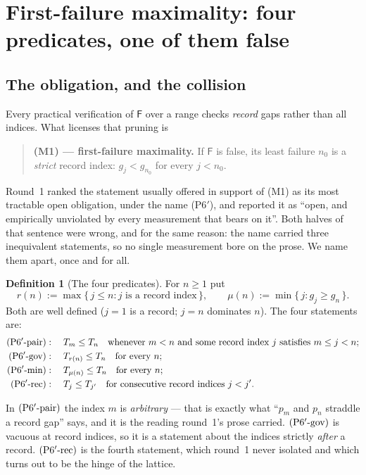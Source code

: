 \documentclass[11pt,a4paper]{article}
\theoremstyle{plain}
\theoremstyle{definition}
\newtheorem{definition}[theorem]{Definition}
\theoremstyle{remark}
\newcommand{\Fb}{\mathsf{F}}
\newcommand{\Ppair}{\textup{(P6$'$-pair)}}
\newcommand{\Pgov}{\textup{(P6$'$-gov)}}
\newcommand{\Pmin}{\textup{(P6$'$-min)}}
\newcommand{\Prec}{\textup{(P6$'$-rec)}}
\begin{document}
\section{First-failure maximality: four predicates, one of them false}
\label{sec:predicates}

\subsection{The obligation, and the collision}

Every practical verification of $\Fb$ over a range checks \emph{record} gaps rather than all
indices. What licenses that pruning is

\begin{quote}
\textbf{(M1) --- first-failure maximality.} If $\Fb$ is false, its least failure $n_0$ is a
\emph{strict} record index: $g_j < g_{n_0}$ for every $j < n_0$.
\end{quote}

Round~1 ranked the statement usually offered in support of (M1) as its most tractable open
obligation, under the name (P6$'$), and reported it as ``open, and empirically unviolated by
every measurement that bears on it''. Both halves of that sentence were wrong, and for the
same reason: the name carried three inequivalent statements, so no single measurement bore on
the prose. We name them apart, once and for all.

\begin{definition}[The four predicates]
\label{def:predicates}
For $n \ge 1$ put
\[
r(n) := \max\{\, j \le n : j \text{ is a record index} \,\},
\qquad
\mu(n) := \min\{\, j : g_j \ge g_n \,\} .
\]
Both are well defined ($j = 1$ is a record; $j = n$ dominates $n$). The four statements are:
\begin{align*}
\Ppair &: \quad T_m \le T_n
  \quad\text{whenever } m < n \text{ and some record index } j \text{ satisfies } m \le j < n;\\
\Pgov  &: \quad T_{r(n)} \le T_n \quad \text{for every } n;\\
\Pmin  &: \quad T_{\mu(n)} \le T_n \quad \text{for every } n;\\
\Prec  &: \quad T_j \le T_{j'} \quad \text{for consecutive record indices } j < j' .
\end{align*}
\end{definition}

In $\Ppair$ the index $m$ is \emph{arbitrary} --- that is exactly what ``$p_m$ and $p_n$
straddle a record gap'' says, and it is the reading round~1's prose carried. $\Pgov$ is
vacuous at record indices, so it is a statement about the indices strictly \emph{after} a
record. $\Prec$ is the fourth statement, which round~1 never isolated and which turns out to
be the hinge of the lattice.
\end{document}
